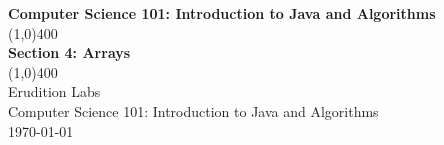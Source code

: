 \documentclass[11]{article}
\begin{document}
\begin{titlepage}
\begin{center}
\vspace{1cm}
\Large{\textbf{Computer Science 101: Introduction to Java and Algorithms}}\\
\vfill
\line(1,0){400}\\
\huge{\textbf{Section 4: Arrays}}\\
\line(1,0){400}\\
\vfill
Erudition Labs\\
Computer Science 101: Introduction to Java and Algorithms\\
\today\\
\end{center}
\end{titlepage}

\tableofcontents
\thispagestyle{empty}
\clearpage
\setcounter{page}{1}
\end{document}
